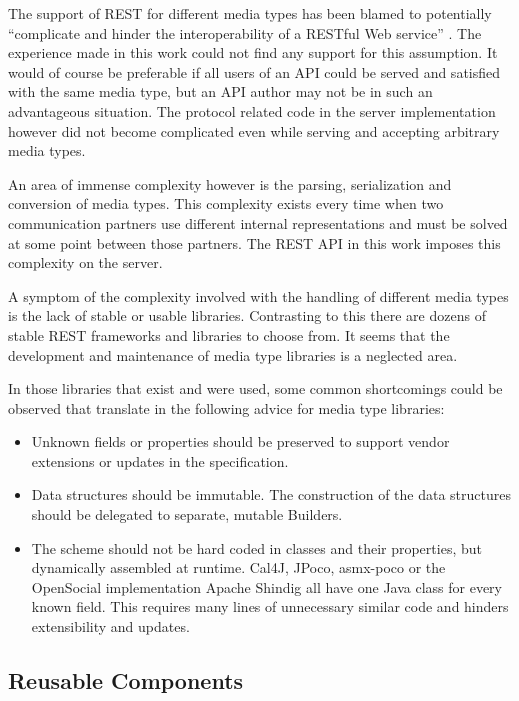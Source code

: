 \documentclass[11pt,a4paper,headsepline,twoside]{scrartcl}		%
\begin{document}
The support of REST for different media types has been blamed to potentially
``complicate and hinder the interoperability of a RESTful Web
service'' \cite[sec. 7.2]{Pautasso2008}. The experience made
in this work could not find any support for this assumption. It would of course
be preferable if all users of an API could be served and satisfied with the
same media type, but an API author may not be in such an advantageous
situation. The protocol related code in the server implementation however did
not become complicated even while serving and accepting arbitrary media types.

An area of immense complexity however is the parsing, serialization and
conversion of media types. This complexity exists every time when two
communication partners use different internal representations and must be solved
at some point between those partners. The REST API in this work imposes this
complexity on the server.

A symptom of the complexity involved with the handling of different media types
is the lack of stable or usable libraries. Contrasting to this there are dozens
of stable REST frameworks and libraries to choose from. It seems that the
development and maintenance of media type libraries is a neglected area.

In those libraries that exist and were used, some common shortcomings could be
observed that translate in the following advice for media type libraries:

\begin{itemize}
\item Unknown fields or properties should be preserved to support vendor
  extensions or updates in the specification.
\item Data structures should be immutable. The construction of the data
  structures should be delegated to separate, mutable Builders.
\item The scheme should not be hard coded in classes and their properties, but
  dynamically assembled at runtime. Cal4J, JPoco, asmx-poco or the OpenSocial
  implementation Apache Shindig all have one Java class for every known field.
  This requires many lines of unnecessary similar code and hinders extensibility
  and updates.
\end{itemize}

\subsection{Reusable Components}
\label{sec:reusable-components}
\end{document}
